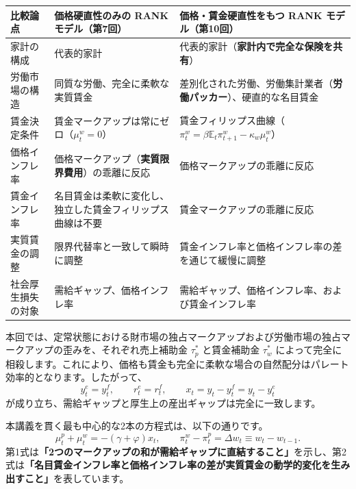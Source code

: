 \documentclass[
  japanese,
  lualatex,
  ja=standard,
  12pt,
  a4paper]{ltjsarticle}
\newcounter{none} %
\begin{document}
{\def\LTcaptype{none} %
\begin{longtable}[]{@{}
  >{\raggedright\arraybackslash}p{}
  >{\raggedright\arraybackslash}p{}
  >{\raggedright\arraybackslash}p{}@{}}
\toprule\noalign{}
\begin{minipage}[b]{\linewidth}\raggedright
比較論点
\end{minipage} & \begin{minipage}[b]{\linewidth}\raggedright
価格硬直性のみの RANK モデル（第7回）
\end{minipage} & \begin{minipage}[b]{\linewidth}\raggedright
価格・賃金硬直性をもつ RANK モデル（第10回）
\end{minipage} \\
\midrule\noalign{}
\endhead
\bottomrule\noalign{}
\endlastfoot
家計の構成 & 代表的家計 &
代表的家計（\textbf{家計内で完全な保険を共有}） \\
労働市場の構造 & 同質な労働、完全に柔軟な実質賃金 &
差別化された労働、労働集計業者（\textbf{労働パッカー}）、硬直的な名目賃金 \\
賃金決定条件 & 賃金マークアップは常にゼロ（\(\mu^w_t=0\)） &
賃金フィリップス曲線（\(\pi^w_t=\beta\mathbb{E}_t\pi^w_{t+1}-\kappa_w\mu^w_t\)） \\
価格インフレ率 & 価格マークアップ（\textbf{実質限界費用}）の乖離に反応 &
価格マークアップの乖離に反応 \\
賃金インフレ率 &
名目賃金は柔軟に変化し、独立した賃金フィリップス曲線は不要 &
賃金マークアップの乖離に反応 \\
実質賃金の調整 & 限界代替率と一致して瞬時に調整 &
賃金インフレ率と価格インフレ率の差を通じて緩慢に調整 \\
社会厚生損失の対象 & 需給ギャップ、価格インフレ率 &
需給ギャップ、価格インフレ率、および賃金インフレ率 \\
\end{longtable}
}

本回では、定常状態における財市場の独占マークアップおよび労働市場の独占マークアップの歪みを、それぞれ売上補助金
\(\tau_p^*\) と賃金補助金 \(\tau_w^*\)
によって完全に相殺します。これにより、価格も賃金も完全に柔軟な場合の自然配分はパレート効率的となります。したがって、
\[
y_t^e=y_t^f,
\qquad
r_t^e=r_t^f,
\qquad
x_t=y_t-y_t^f=y_t-y_t^e
\] が成り立ち、需給ギャップと厚生上の産出ギャップは完全に一致します。

本講義を貫く最も中心的な2本の方程式は、以下の通りです。 \[
\mu_t^p+\mu_t^w=-(\gamma+\varphi)x_t,
\qquad
\pi_t^w-\pi_t^p=\Delta w_t \equiv w_t - w_{t-1}.
\]
第1式は\textbf{「2つのマークアップの和が需給ギャップに直結すること」}を示し、第2式は\textbf{「名目賃金インフレ率と価格インフレ率の差が実質賃金の動学的変化を生み出すこと」}を表しています。
\end{document}
